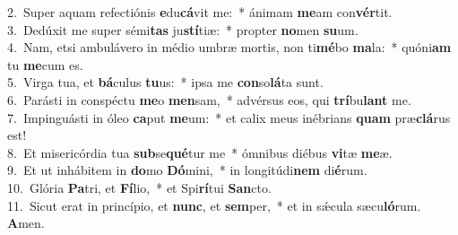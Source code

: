 {2.~}Super aquam refectiónis \textbf{e}du\textbf{cá}vit me:~* ánimam \textbf{me}am con\textbf{vér}tit.\\
{3.~}Dedúxit me super sémi\textbf{tas} ju\textbf{stí}tiæ:~* propter \textbf{no}men \textbf{su}um.\\
{4.~}Nam, etsi ambulávero in médio umbræ mortis, non ti\textbf{mé}bo \textbf{ma}la:~* quóni\textbf{am} tu \textbf{me}cum es.\\
{5.~}Virga tua, et \textbf{bá}culus \textbf{tu}us:~* ipsa me \textbf{con}so\textbf{lá}ta sunt.\\
{6.~}Parásti in conspéctu \textbf{me}o \textbf{men}sam,~* advérsus eos, qui \textbf{trí}bu\textbf{lant} me.\\
{7.~}Impinguásti in óleo \textbf{ca}put \textbf{me}um:~* et calix meus inébrians \textbf{quam} præ\textbf{clá}rus est!\\
{8.~}Et misericórdia tua \textbf{sub}se\textbf{qué}tur me~* ómnibus diébus \textbf{vi}tæ \textbf{me}æ.\\
{9.~}Et ut inhábitem in \textbf{do}mo \textbf{Dó}mini,~* in longitúdi\textbf{nem} di\textbf{é}rum.\\
{10.~}Glória \textbf{Pa}tri, et \textbf{Fí}lio,~* et Spi\textbf{rí}tui \textbf{San}cto.\\
{11.~}Sicut erat in princípio, et \textbf{nunc}, et \textbf{sem}per,~* et in sǽcula sæcu\textbf{ló}rum. \textbf{A}men.\\
